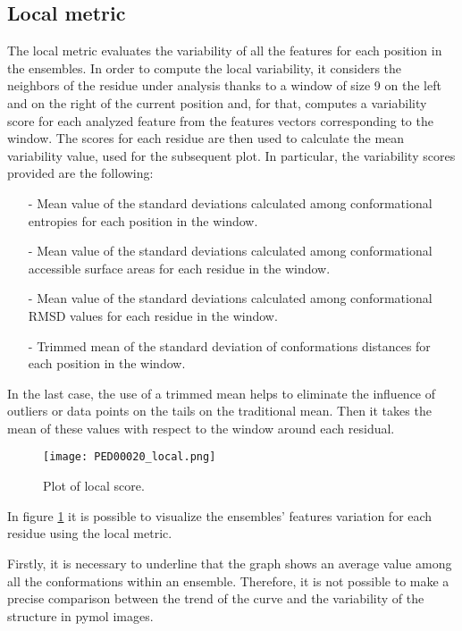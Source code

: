 \subsection{Local metric}
The local metric evaluates the variability of all the features for each position in the ensembles.
In order to compute the local variability, it considers the neighbors of the residue under analysis thanks to a window of size 9 on the left and on the right of the current position and, for that, computes a variability score for each analyzed feature from the features vectors corresponding to the window. The scores for each residue are then used to calculate the mean variability value, used for the subsequent plot. In particular, the variability scores provided are the following:

\begin{itemize}
\item[-] Mean value of the standard deviations calculated among conformational entropies for each position in the window.
\item[-] Mean value of the standard deviations calculated among conformational accessible surface areas for each residue in the window.
\item[-] Mean value of the standard deviations calculated among conformational RMSD values for each residue in the window. 
\item[-] Trimmed mean of the standard deviation of conformations distances for each position in the window. 
\end{itemize}

In the last case, the use of a trimmed mean helps to eliminate the influence of outliers or data points on the tails on the traditional mean. Then it takes the mean of these values with respect to the window around each residual.

\begin{figure}[H]
	\begin{minipage}[b]{0.97\textwidth}
		\centering
		\texttt{[image: PED00020\_local.png]}
		\caption{Plot of local score.}
		\label{plot}
	\end{minipage}	
\end{figure}

In figure \ref{plot} it is possible to visualize the ensembles' features variation for each residue using the local metric. 

\medskip
Firstly, it is necessary to underline that the graph shows an average value among all the conformations within an ensemble. Therefore, it is not possible to make a precise comparison between the trend of the curve and the variability of the structure in pymol images. 

